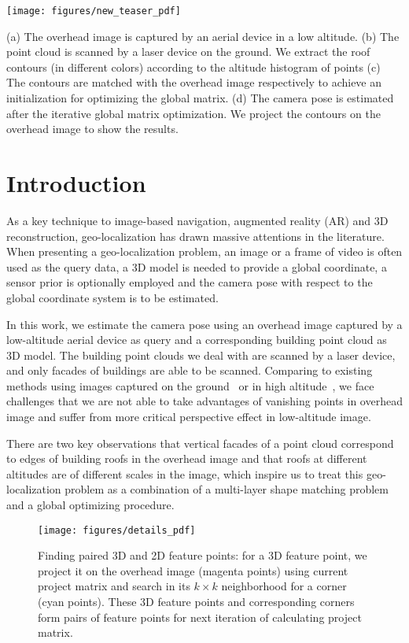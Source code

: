 
\begin{teaserfigure}
	\texttt{[image: figures/new\_teaser\_pdf]}
	\caption{(a) The overhead image is captured by an aerial device in a low altitude. (b) The point cloud is scanned by a laser device on the ground. We extract the roof contours (in different colors) according to the altitude histogram of points (c) The contours are matched with the overhead image respectively to achieve an initialization for optimizing the global matrix. (d) The camera pose is estimated after the iterative global matrix optimization. We project the contours on the overhead image to show the results.}
	\label{fig:teaser}
\end{teaserfigure}


\maketitle



\section{Introduction}
%
As a key technique to image-based navigation, augmented reality (AR) and 3D reconstruction, geo-localization has drawn massive attentions in the literature. When presenting a geo-localization problem, an image or a frame of video is often used as the query data, a 3D model is needed to provide a global coordinate, a sensor prior is optionally employed and the camera pose with respect to the global coordinate system is to be estimated. 

In this work, we estimate the camera pose using an overhead image captured by a low-altitude aerial device as query and a corresponding building point cloud as 3D model. The building point clouds we deal with are scanned by a laser device, and only facades of buildings are able to be scanned. Comparing to existing methods using images captured on the ground~\cite{instant} or in high altitude~\cite{FDCM}, we face challenges that we are not able to take advantages of vanishing points in overhead image and suffer from more critical perspective effect in low-altitude image. 

There are two key observations that vertical facades of a point cloud correspond to edges of building roofs in the overhead image and that roofs at different altitudes are of different scales in the image, which inspire us to treat this geo-localization problem as a combination of a multi-layer shape matching problem and a global optimizing procedure. 
%
\begin{figure}[t]
	\centering
	\texttt{[image: figures/details\_pdf]}
	\caption{Finding paired 3D and 2D feature points: for a 3D feature point, we project it on the overhead image (magenta points) using current project matrix and search in its $k\times k$ neighborhood for a corner (cyan points). These 3D feature points and corresponding corners form pairs of feature points for next iteration of calculating project matrix.}
	\label{fig:overview}
\end{figure}
